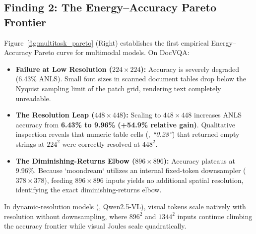 \subsection{Finding 2: The Energy--Accuracy Pareto Frontier}
Figure~\ref{fig:multitask_pareto} (Right) establishes the first empirical Energy--Accuracy Pareto curve for multimodal models. On DocVQA:
\begin{itemize}[leftmargin=*]
    \item \textbf{Failure at Low Resolution ($224\times 224$):} Accuracy is severely degraded (6.43\% ANLS). Small font sizes in scanned document tables drop below the Nyquist sampling limit of the patch grid, rendering text completely unreadable.
    \item \textbf{The Resolution Leap ($448\times 448$):} Scaling to $448\times 448$ increases ANLS accuracy from \textbf{6.43\% to 9.96\% (+54.9\% relative gain)}. Qualitative inspection reveals that numeric table cells (\eg, \emph{``0.28''}) that returned empty strings at $224^2$ were correctly resolved at $448^2$.
    \item \textbf{The Diminishing-Returns Elbow ($896\times 896$):} Accuracy plateaus at 9.96\%. Because `moondream` utilizes an internal fixed-token downsampler ($378\times 378$), feeding $896\times 896$ inputs yields no additional spatial resolution, identifying the exact diminishing-returns elbow.
\end{itemize}
In dynamic-resolution models (\eg, Qwen2.5-VL), visual tokens scale natively with resolution without downsampling, where $896^2$ and $1344^2$ inputs continue climbing the accuracy frontier while visual Joules scale quadratically.
